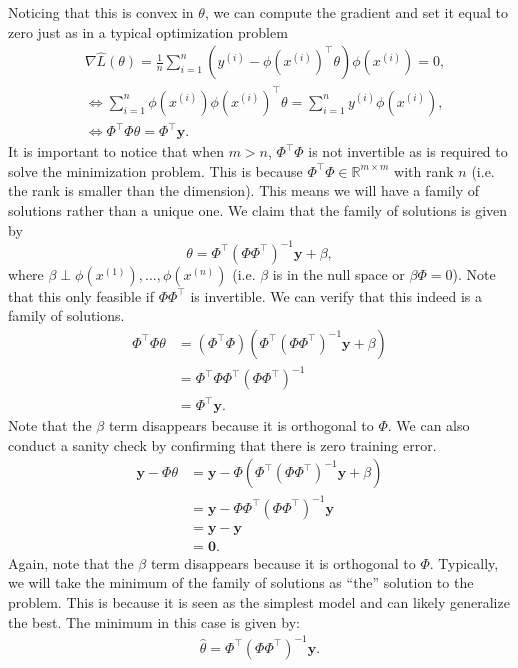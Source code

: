 \noindent Noticing that this is convex in $\theta$, we can compute the gradient and set it equal to zero just as in a typical optimization problem
\begin{align*}
&\nabla \hat{L}(\theta) = \frac{1}{n} \sum_{i=1}^n \left( y^{(i)} - \phi(x^{(i)})^\top\theta \right)\phi(x^{(i)}) = 0, \\
& \Leftrightarrow \sum_{i=1}^n \phi(x^{(i)})\phi(x^{(i)})^\top \theta = \sum_{i=1}^n y^{(i)}\phi(x^{(i)}), \\
& \Leftrightarrow \Phi^\top \Phi \theta = \Phi^\top \bm{y}.
\end{align*}
It is important to notice that when $m > n$, $\Phi^\top \Phi$ is not invertible as is required to solve the minimization problem. This is because $\Phi^\top \Phi \in \mathbb{R}^{m \times m}$ with rank $n$ (i.e. the rank is smaller than the dimension). This means we will have a family of solutions rather than a unique one. We claim that the family of solutions is given by
$$
\theta = \Phi^\top (\Phi \Phi^\top )^{-1}\bm{y} + \beta,
$$
where $\beta \perp \phi(x^{(1)}), ..., \phi(x^{(n)})$ (i.e. $\beta$ is in the null space or $\beta \Phi = 0$). Note that this only feasible if $\Phi \Phi^\top$ is invertible. We can verify that this indeed is a family of solutions.
\begin{align*}
    \Phi^\top \Phi \theta &= (\Phi^\top \Phi)(\Phi^\top (\Phi \Phi^\top )^{-1}\bm{y} + \beta) \\
    &= \Phi^\top \Phi \Phi^\top (\Phi\Phi^\top)^{-1} \\
    &= \Phi^\top \bm{y}.
\end{align*}
Note that the $\beta$ term disappears because it is orthogonal to $\Phi$. We can also conduct a sanity check by confirming that there is zero training error.
\begin{align*}
    \bm{y} - \Phi\theta &= \bm{y} - \Phi(\Phi^\top (\Phi \Phi^\top )^{-1}\bm{y} + \beta) \\
    &= \bm{y} - \Phi\Phi^\top (\Phi\Phi^\top)^{-1}\bm{y} \\
    &= \bm{y} - \bm{y} \\
    &= \bm{0}.
\end{align*}
Again, note that the $\beta$ term disappears because it is orthogonal to $\Phi$. Typically, we will take the minimum of the family of solutions as ``the'' solution to the problem. This is because it is seen as the simplest model and can likely generalize the best. The minimum in this case is given by:
\begin{align}
\hat{\theta} = \Phi^\top (\Phi \Phi^\top )^{-1}\bm{y}.
\end{align}
